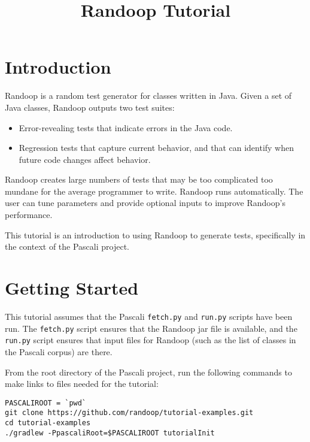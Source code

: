 \documentclass[11pt, oneside]{article} %
\title{Randoop Tutorial}
\newcommand{\cmd}[1]{{\texttt{#1}}}
\begin{document}
\maketitle

\section{Introduction}
Randoop is a random test generator for classes written in Java.
Given a set of Java classes, Randoop outputs two test suites:
\begin{itemize}
\item Error-revealing tests that indicate errors in the Java code.
\item Regression tests that capture current behavior, and that can identify
  when future code changes affect behavior.
\end{itemize}
Randoop creates large numbers of tests that may be too complicated too
mundane for the average programmer to write.
Randoop runs automatically.  The user can tune parameters and provide
optional inputs to improve Randoop's performance.

This tutorial is an introduction to using Randoop to generate tests, specifically in the context of the Pascali project.

\section{Getting Started}
This tutorial assumes that the Pascali \cmd{fetch.py} and \cmd{run.py}
scripts have been run.
The \cmd{fetch.py} script ensures that the Randoop jar file is available,
and the \cmd{run.py} script ensures that input files for Randoop (such as
the list of classes in the Pascali corpus) are there.

From the root directory of the Pascali project, run the
following commands to make links to files needed for the tutorial:
\begin{verbatim}
PASCALIROOT = `pwd`
git clone https://github.com/randoop/tutorial-examples.git
cd tutorial-examples
./gradlew -PpascaliRoot=$PASCALIROOT tutorialInit 
\end{verbatim}
\end{document}
